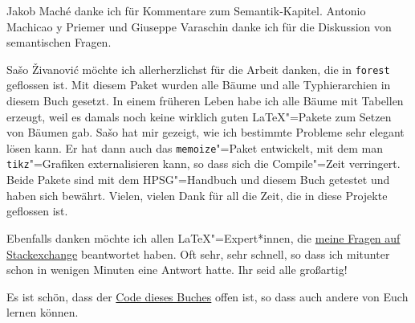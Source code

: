 Jakob Maché danke ich für Kommentare zum Semantik-Kapitel.
Antonio Machicao y Priemer und Giuseppe Varaschin danke ich für die Diskussion von semantischen Fragen.

Sašo Živanović möchte ich allerherzlichst für die Arbeit danken, die in \texttt{forest} geflossen
ist. Mit diesem Paket wurden alle Bäume und alle Typhierarchien in diesem Buch gesetzt. In einem
früheren Leben habe ich alle Bäume mit Tabellen erzeugt, weil es damals noch keine wirklich guten
\LaTeX"=Pakete zum Setzen von Bäumen gab. Sašo hat mir gezeigt, wie ich bestimmte Probleme sehr
elegant lösen kann. Er hat dann auch das \texttt{memoize}"=Paket entwickelt, mit dem man \texttt{tikz}"=Grafiken
externalisieren kann, so dass sich die Compile"=Zeit verringert. Beide Pakete sind mit dem
HPSG"=Handbuch und diesem Buch getestet und haben sich bewährt. Vielen, vielen Dank für all die Zeit,
die in diese Projekte geflossen ist.

Ebenfalls danken möchte ich allen \LaTeX"=Expert*innen, die \href{https://tex.stackexchange.com/users/18561/stefan-m%c3%bcller?tab=questions}{meine Fragen auf Stackexchange}
beantwortet haben. Oft sehr, sehr schnell, so dass ich mitunter schon in wenigen Minuten eine
Antwort hatte. Ihr seid alle großartig!

Es ist schön, dass der \href{https://github.com/stefan11/HPSG-Lehrbuch}{Code dieses Buches} offen ist, so dass auch andere von Euch lernen können.


